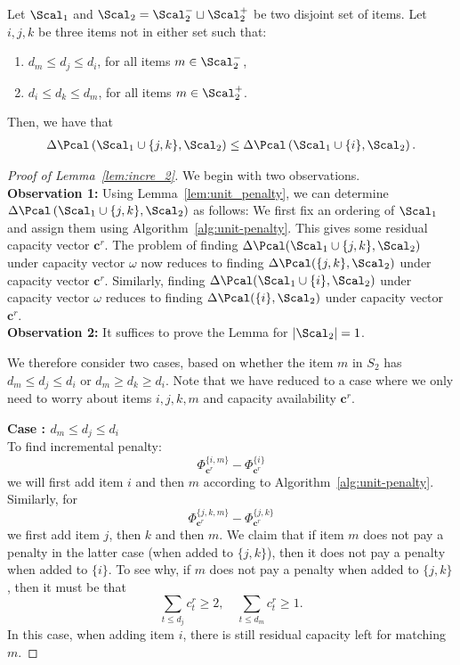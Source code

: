 \begin{lemma}\label{lem:incre_2}
	Let $\Scal_1$ and $\Scal_2 = {\Scal}_2^-\sqcup {\Scal}_2^+$ be two disjoint set of items. Let $i, j, k$ be three items not in either set such that:
	\begin{enumerate}
		\item $d_m \leq d_j \leq d_i$, for all items $m \in \Scal_2^-$,
		\item $d_i \leq d_k \leq d_m$, for all items $m \in \Scal_2^+$.
	\end{enumerate}
	Then, we have that
	\begin{align}
	\Delta\Pcal\left(\Scal_1\cup \{j,k\}, \Scal_2\right)\le \Delta\Pcal\left(\Scal_1\cup\{i\}, \Scal_2 \right).
	\end{align}
\end{lemma}
\begin{proof}[Proof of Lemma~\ref{lem:incre_2}]
    We begin with two observations.\\
{\bf Observation 1:} Using Lemma~\ref{lem:unit_penalty}, we can determine $\Delta \Pcal\left(  \Scal_1 \cup \{j,k\} , \Scal_2 \right)$ as follows: We first fix an ordering of $\Scal_1$ and assign them using Algorithm~\ref{alg:unit-penalty}. This gives some residual capacity vector $\mathbf{c}^r$. The problem of finding $\Delta \Pcal(\Scal_1 \cup \{j,k\}, \Scal_2)$ under capacity vector $\omega$ now reduces to finding $\Delta \Pcal(\{j,k\}, \Scal_2)$ under capacity vector $\mathbf{c}^r$. Similarly,  finding $\Delta \Pcal(\Scal_1 \cup \{i\}, \Scal_2)$ under capacity vector $\omega$ reduces to finding $\Delta \Pcal(\{i\}, \Scal_2)$ under capacity vector $\mathbf{c}^r$.\\ 

{\bf Observation 2:} It suffices to prove the Lemma for $|\Scal_{2}|=1$.

We therefore consider two cases, based on whether the item $m$ in $S_2$ has $d_m \leq d_j \leq d_i$ or $d_m \geq d_k \geq d_i$. Note that we have reduced to a case where we only need to worry about items $i,j,k,m$ and capacity availability $\mathbf{c}^r$. 

{\bf Case : $d_m \leq d_j \leq d_i$}\\
To find incremental penalty:
\[ \Phi^{\{i,m\}}_{\mathbf{c}^r} - \Phi^{\{i\}}_{\mathbf{c}^r} \]
we will first add item $i$ and then $m$ according to Algorithm~\ref{alg:unit-penalty}. Similarly, for 
\[ \Phi^{\{j,k,m\}}_{\mathbf{c}^r} - \Phi^{\{j,k\}}_{\mathbf{c}^r} \]
we first add item $j$, then $k$ and then $m$. 
We claim that if item $m$ does not pay a penalty in the latter case (when added to $\{j,k\}$), then it does not pay a penalty when added to $\{i\}$. To see why, if $m$ does not pay a penalty when added to $\{j,k\}$, then it must be that 
\[  \sum_{t \leq d_j} c_t^r \geq 2, \quad \sum_{t \leq d_m} c_t^r \geq 1. \]
In this case, when adding item $i$, there is still residual capacity left for matching $m$.


\end{proof}
